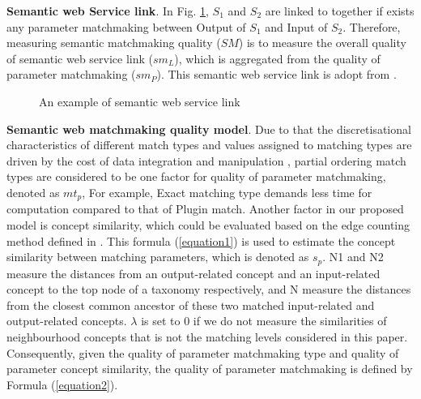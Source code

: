 \documentclass{IEEEtran}
\begin{document}
\textbf{Semantic web Service link}. In Fig. \ref{semanticLink}, $S_{1}$ and $S_{2}$ are linked to together if exists any parameter matchmaking between  Output of $S_1$ and Input of $S_2$.  Therefore, measuring semantic matchmaking quality ($SM$) is to measure the overall quality of semantic web service link ($sm_{L}$), which is aggregated from the quality of parameter matchmaking ($sm_{P}$). This semantic web service link is adopt from \cite{lecue2009optimizing}.

\begin{figure}[h]
\centering
{}
 \caption{ An example of semantic web service link}
 \label{semanticLink}
\end{figure}


\textbf{Semantic web matchmaking quality model}. Due to that the discretisational characteristics of different match types and values assigned to matching types are driven by the cost of data integration and manipulation \cite{lecue2009optimizing}, partial ordering match types are considered to be one factor for quality of parameter matchmaking, denoted as $mt_{p}$,  For example, Exact matching type demands less time for computation compared to that of Plugin match. Another factor in our proposed model is concept similarity, which could be evaluated based on the edge counting method defined in \cite{shet2012new}. This formula (\ref{equation1}) is used to estimate the concept similarity between matching parameters, which is denoted as $s_{p}$. N1 and N2 measure the distances from an output-related concept and an input-related concept to the top node of a taxonomy respectively, and N measure the distances from the closest common ancestor of these two matched input-related and output-related concepts. $\lambda$ is set to 0 if we do not measure the similarities of neighbourhood concepts that is not the matching levels considered in this paper. Consequently, given the quality of parameter matchmaking type and quality of parameter concept similarity, the quality of parameter matchmaking is defined by Formula (\ref{equation2}).
\end{document}
